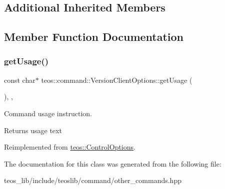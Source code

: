 \subsection*{Additional Inherited Members}


\subsection{Member Function Documentation}
\mbox{\label{classteos_1_1command_1_1_version_client_options_a28b69107e8eb50a2faf9594958bb1d6d}} 
\subsubsection{\texorpdfstring{get\+Usage()}{getUsage()}}
{\footnotesize\ttfamily const char$\ast$ teos\+::command\+::\+Version\+Client\+Options\+::get\+Usage (\begin{DoxyParamCaption}{ }\end{DoxyParamCaption})\hspace{0.3cm}{\ttfamily [inline]}, {\ttfamily [protected]}, {\ttfamily [virtual]}}



Command \textquotesingle{}usage\textquotesingle{} instruction. 

\begin{DoxyReturn}{Returns}
usage text 
\end{DoxyReturn}


Reimplemented from \mbox{\hyperlink{classteos_1_1_control_options_a0aa5671f9bc750ed5280c26c543874f3}{teos\+::\+Control\+Options}}.



The documentation for this class was generated from the following file\+:\begin{DoxyCompactItemize}
\item 
teos\+\_\+lib/include/teoslib/command/other\+\_\+commands.\+hpp\end{DoxyCompactItemize}
